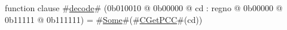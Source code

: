 function clause #\hyperref[zdecode]{decode}# (0b010010 @ 0b00000 @ cd : regno @    0b00000 @    0b11111 @ 0b111111) = #\hyperref[zSome]{Some}#(#\hyperref[zCGetPCC]{CGetPCC}#(cd))
